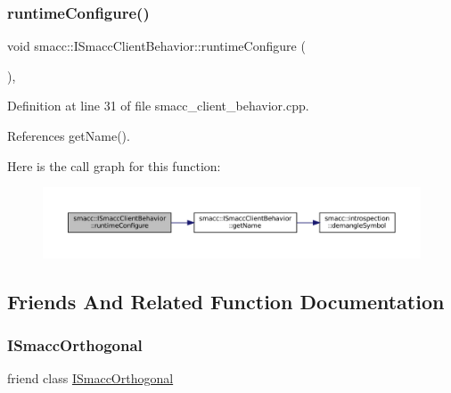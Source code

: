 \subsubsection{\texorpdfstring{runtime\+Configure()}{runtimeConfigure()}}
{\footnotesize\ttfamily void smacc\+::\+I\+Smacc\+Client\+Behavior\+::runtime\+Configure (\begin{DoxyParamCaption}{ }\end{DoxyParamCaption})\hspace{0.3cm}{\ttfamily [protected]}, {\ttfamily [virtual]}}



Definition at line 31 of file smacc\+\_\+client\+\_\+behavior.\+cpp.



References get\+Name().


Here is the call graph for this function\+:
\nopagebreak
\begin{figure}[H]
\begin{center}
\leavevmode
\includegraphics[width=350pt]{classsmacc_1_1ISmaccClientBehavior_a1078de57f291301cc2829c3548fa5ea5_cgraph}
\end{center}
\end{figure}


\subsection{Friends And Related Function Documentation}
\mbox{\label{classsmacc_1_1ISmaccClientBehavior_a7205cc84a71fea903124d54d01e99a68}} 
\subsubsection{\texorpdfstring{I\+Smacc\+Orthogonal}{ISmaccOrthogonal}}
{\footnotesize\ttfamily friend class \hyperlink{classsmacc_1_1ISmaccOrthogonal}{I\+Smacc\+Orthogonal}\hspace{0.3cm}{\ttfamily [friend]}}



